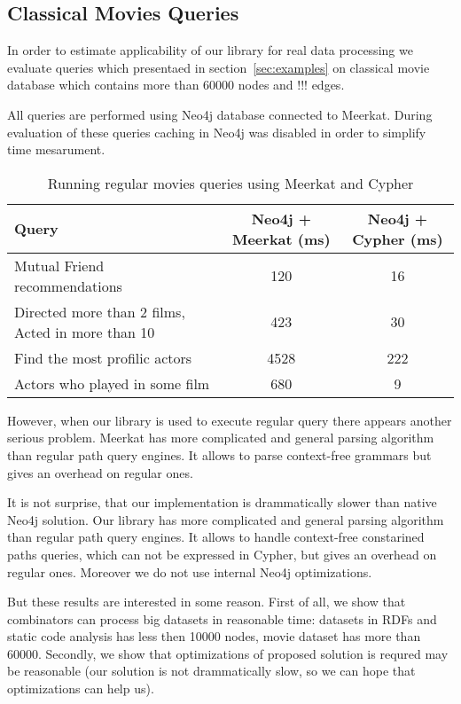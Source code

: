 \subsection{Classical Movies Queries}

In order to estimate applicability of our library for real data processing we evaluate queries 
which presentaed in section~\ref{sec:examples} on classical movie database which contains more than 
60000 nodes and !!! edges.

All queries are performed using Neo4j database connected to Meerkat.
During evaluation of these queries caching in Neo4j was disabled in order to simplify time mesarument.

\begin{table*}[t]
\centering
\begin{tabular}{|l|c|c|}
\hline
{Query} &
{Neo4j + Meerkat (ms)} &
{Neo4j + Cypher (ms)} \\
\hline
\hline
Mutual Friend recommendations & 120 & 16 \\
Directed more than 2 films, Acted in more than 10 & 423 & 30 \\
Find the most profilic actors & 4528 & 222 \\
Actors who played in some film & 680 & 9 \\
\hline
\end{tabular}
\caption{Running regular movies queries using Meerkat and Cypher}
\label{table:movies}
\end{table*}

However, when our library is used to execute regular query there appears another serious problem.
Meerkat has more complicated and general parsing algorithm than regular path query engines.
It allows to parse context-free grammars but gives an overhead on regular ones.


It is not surprise, that our implementation is drammatically slower than native Neo4j solution.
Our library has more complicated and general parsing algorithm than regular path query engines.
It allows to handle context-free constarined paths queries, which can not be expressed in Cypher, but gives an overhead on regular ones.
Moreover we do not use internal Neo4j optimizations. 

But these results are interested in some reason.
First of all, we show that combinators can process big datasets in reasonable time: datasets in RDFs and static code analysis has less then 10000 nodes, movie dataset has more than 60000.
Secondly, we show that optimizations of proposed solution is requred may be reasonable (our 
solution is not drammatically slow, so we can hope that optimizations can help us).


